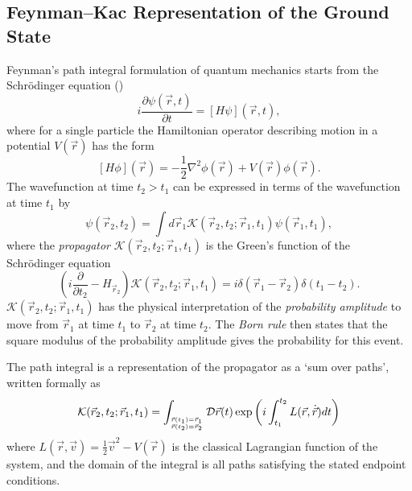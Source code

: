 \documentclass[12pt]{msml2020} %
\begin{document}
\subsection{Feynman--Kac Representation of the Ground State}

Feynman's path integral formulation of quantum mechanics starts from the Schr\"odinger equation (\cite{Feynman:1965aa})
%
\begin{equation}
  i\frac{\partial\psi(\vec{r},t)}{\partial t} = \left[H\psi\right](\vec{r},t),
\end{equation}
%
where for a single particle the Hamiltonian operator describing motion in a potential $V(\vec{r})$ has the form
%
\begin{equation}
  \left[H\phi\right](\vec{r}) = -\frac{1}{2}\nabla^2\phi(\vec{r}) + V(\vec{r})\phi(\vec{r}).
\end{equation}
%
The wavefunction at time $t_2>t_1$ can be expressed in terms of the wavefunction at time $t_1$ by
%
\begin{equation}
  \psi(\vec{r}_2,t_2) = \int d\vec{r}_1 \mathcal{K}(\vec{r}_2,t_2;\vec{r}_1,t_1)\psi(\vec{r}_1,t_1),
\end{equation}
%
where the \emph{propagator} $\mathcal{K}(\vec{r}_2,t_2;\vec{r}_1,t_1)$ is the Green's function of the Schr\"odinger equation
%
\begin{equation}
  \left(i\frac{\partial}{\partial t_2} - H_{\vec{r}_2}\right)\mathcal{K}(\vec{r}_2,t_2;\vec{r}_1,t_1) =i\delta(\vec{r}_1-\vec{r}_2)\delta(t_1-t_2).
\end{equation}
%
$\mathcal{K}(\vec{r}_2,t_2;\vec{r}_1,t_1)$ has the physical interpretation of the \emph{probability amplitude} to move from $\vec{r}_1$ at time $t_1$ to $\vec{r}_2$ at time $t_2$. The \emph{Born rule} then states that the square modulus of the probability amplitude gives the probability for this event.

The path integral is a representation of the propagator as a `sum over paths', written formally as
%
\begin{equation}\label{eq:real-time}
  \mathcal{K}(\vec{r}_2,t_2;\vec{r}_1,t_1) = \int_{\vec{r}(t_1)=\vec{r}_1 \atop \vec{r}(t_2)=\vec{r}_2} \mathcal{D}\vec{r}(t)\exp\left(i\int_{t_1}^{t_2} L(\vec{r},\dot{\vec{r}})dt\right)
\end{equation}
%
where $L(\vec{r},\vec{v}) = \frac{1}{2}\vec{v}^2 - V(\vec{r})$ is the classical Lagrangian function of the system, and the domain of the integral is all paths satisfying the stated endpoint conditions.
\end{document}
